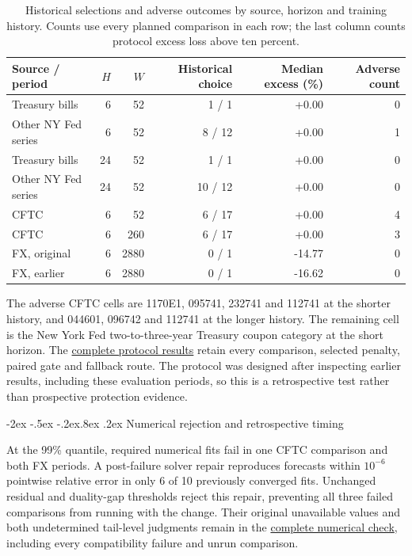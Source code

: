 \documentclass[10pt,a4paper]{article}
\makeatletter
\renewcommand\section{\@startsection{section}{1}{\z@}%
  {-2ex \@plus -.5ex \@minus -.2ex}{.8ex \@plus .2ex}%
  {\normalfont\large\bfseries}}
\makeatother
\begin{document}
\begin{table}[!htbp]\centering\footnotesize\setlength{\tabcolsep}{4pt}
\caption{Historical selections and adverse outcomes by source, horizon and training history. Counts use every planned comparison in each row; the last column counts protocol excess loss above ten percent.}\label{tab:v13-routing}
\begin{tabular}{lrrr rr}\toprule
Source / period & $H$ & $W$ & Historical choice & Median excess (\%) & Adverse count\\\midrule
Treasury bills & 6 & 52 & 1 / 1 & +0.00 & 0 \\
Other NY Fed series & 6 & 52 & 8 / 12 & +0.00 & 1 \\
Treasury bills & 24 & 52 & 1 / 1 & +0.00 & 0 \\
Other NY Fed series & 24 & 52 & 10 / 12 & +0.00 & 0 \\
CFTC & 6 & 52 & 6 / 17 & +0.00 & 4 \\
CFTC & 6 & 260 & 6 / 17 & +0.00 & 3 \\
FX, original & 6 & 2880 & 0 / 1 & -14.77 & 0 \\
FX, earlier & 6 & 2880 & 0 / 1 & -16.62 & 0 \\
\bottomrule\end{tabular}
\end{table}

The adverse CFTC cells are 1170E1, 095741, 232741 and 112741 at the shorter history, and 044601, 096742 and 112741 at the longer history. The remaining cell is the New York Fed two-to-three-year Treasury coupon category at the short horizon. The \href{https://github.com/ByronLi0207/financial-mathematics-paper-20261020/tree/revision-v13/results/v13/recommended-protocol}{complete protocol results} retain every comparison, selected penalty, paired gate and fallback route. The protocol was designed after inspecting earlier results, including these evaluation periods, so this is a retrospective test rather than prospective protection evidence.

\FloatBarrier


\section{Numerical rejection and retrospective timing}\label{sup:wp5}\label{sup:reproduction}\label{sup:v12-details}

At the 99\% quantile, required numerical fits fail in one CFTC comparison and both FX periods. A post-failure solver repair reproduces forecasts within $10^{-6}$ pointwise relative error in only 6 of 10 previously converged fits. Unchanged residual and duality-gap thresholds reject this repair, preventing all three failed comparisons from running with the change. Their original unavailable values and both undetermined tail-level judgments remain in the \href{https://github.com/ByronLi0207/financial-mathematics-paper-20261020/tree/revision-v13/results/v13/tau-repair}{complete numerical check}, including every compatibility failure and unrun comparison.
\end{document}
